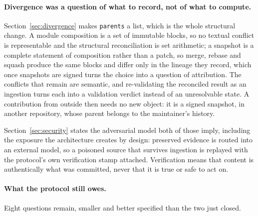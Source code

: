 \documentclass[11pt,a4paper]{article}
\begin{document}
\paragraph{Divergence was a question of what to record, not of what to compute.}
Section~\ref{sec:divergence} makes \texttt{parents} a list, which is the whole
structural change. A module composition is a set of immutable blocks, so no
textual conflict is representable and the structural reconciliation is set
arithmetic; a snapshot is a complete statement of composition rather than a
patch, so merge, rebase and squash produce the same blocks and differ only in
the lineage they record, which once snapshots are signed turns the choice into
a question of attribution. The conflicts that remain are semantic, and
re-validating the reconciled result as an ingestion turns each into a
validation verdict instead of an unresolvable state. A contribution from
outside then needs no new object: it is a signed snapshot, in another
repository, whose parent belongs to the maintainer's history.

Section~\ref{sec:security} states the adversarial model both of those imply,
including the exposure the architecture creates by design: preserved evidence is
routed into an external model, so a poisoned source that survives ingestion is
replayed with the protocol's own verification stamp attached. Verification means that content is authentically what was committed, never
that it is true or safe to act on.

\paragraph{What the protocol still owes.}
Eight questions remain, smaller and better specified than the two just closed.
\end{document}
